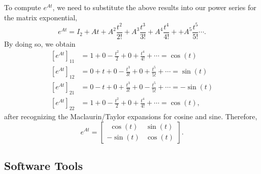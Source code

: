 \begin{enumerate}
To compute $e^{At}$, we need to substitute the above results into our power series for the matrix exponential,
$$e^{At}=I_2+At+A^2 \frac{t^2}{2!}+A^3 \frac{t^3}{3!}+A^4\frac{t^4}{4!}+ +A^5\frac{t^5}{5!}\cdots.$$
By doing so, we obtain
\begin{align*}
\left[e^{At} \right]_{11} &= 1 + 0 - \frac{t^2}{2}+0+\frac{t^4}{4!} + \cdots = \cos(t) \\[1em]
\left[e^{At} \right]_{12}  &= 0+t+0 - \frac{t^3}{3!}+0+\frac{t^5}{5!} + \cdots = \sin(t) \\[1em]
\left[e^{At} \right]_{21} &= 0 - t + 0 +\frac{t^3}{3!}+0-\frac{t^5}{5!} + \cdots = -\sin(t) \\[1em]
\left[e^{At} \right]_{22}  &= 1 + 0 - \frac{t^2}{2}+0+\frac{t^4}{4!} + \cdots = \cos(t),    
\end{align*}
after recognizing the Maclaurin/Taylor expansions for cosine and sine. Therefore, 
$$e^{At}=\begin{bmatrix} ~~\cos(t) & \sin(t) \\ - \sin(t) & \cos(t) \end{bmatrix}.$$
\end{enumerate} 


\Qed

\bigskip
\subsection{Software Tools}

